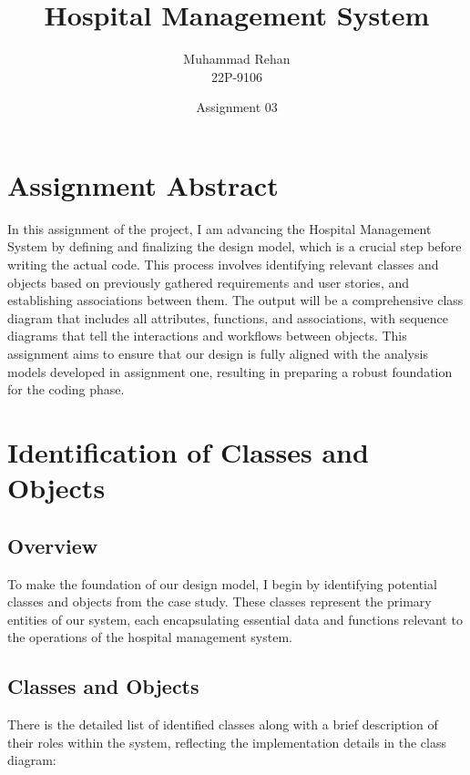 \documentclass[12pt]{article}
\title{Hospital Management System}
\author{Muhammad Rehan \\ 22P-9106}
\date{Assignment 03}
\begin{document}
\maketitle

\section*{Assignment Abstract}
In this assignment of the project, I am advancing the Hospital Management System by defining and finalizing the design model, which is a crucial step before writing the actual code. This process involves identifying relevant classes and objects based on previously gathered requirements and user stories, and establishing associations between them. The output will be a comprehensive class diagram that includes all attributes, functions, and associations, with sequence diagrams that tell the interactions and workflows between objects. This assignment aims to ensure that our design is fully aligned with the analysis models developed in assignment one, resulting in preparing a robust foundation for the coding phase.

\section*{Identification of Classes and Objects}
\subsection*{Overview}
To make the foundation of our design model, I begin by identifying potential classes and objects from the case study. These classes represent the primary entities of our system, each encapsulating essential data and functions relevant to the operations of the hospital management system.

\subsection*{Classes and Objects}
There is the detailed list of identified classes along with a brief description of their roles within the system, reflecting the implementation details in the class diagram:
\end{document}
